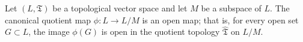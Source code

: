 Let $(L, \mathfrak{T})$ be a topological vector space and let $M$ be a subspace of $L$. The canonical quotient map $\phi : L \to L/M$ is an open map; that is, for every open set $G \subset L$, the image $\phi(G)$ is open in the quotient topology $\hat{\mathfrak{T}}$ on $L/M$.
